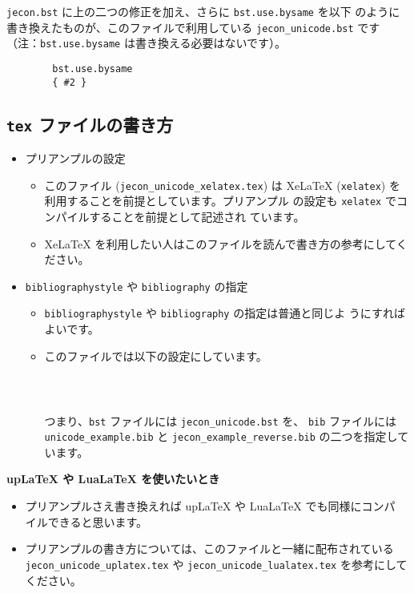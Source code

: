 \documentclass[a4paper,10pt]{bxjsarticle}
\begin{document}
\texttt{jecon.bst} に上の二つの修正を加え、さらに \texttt{bst.use.bysame} を以下
のように書き換えたものが、このファイルで利用している \texttt{jecon\_unicode.bst}
です（注：\texttt{bst.use.bysame} は書き換える必要はないです）。
\begin{verbatim}
        bst.use.bysame
        { #2 }
\end{verbatim}

\subsection{\texttt{tex} ファイルの書き方}

\begin{itemize}
 \item プリアンプルの設定
       \begin{itemize}
        \item このファイル (\texttt{jecon\_unicode\_xelatex.tex}) は XeLaTeX
              (\texttt{xelatex}) を利用することを前提としています。プリアンプル
              の設定も \texttt{xelatex} でコンパイルすることを前提として記述され
	      ています。
        \item XeLaTeX を利用したい人はこのファイルを読んで書き方の参考にしてく
              ださい。
       \end{itemize}
 \item \texttt{bibliographystyle} や \texttt{bibliography} の指定
       \begin{itemize}
	\item \texttt{bibliographystyle} や \texttt{bibliography} の指定は普通と同じよ
       うにすればよいです。
	\item このファイルでは以下の設定にしています。
\begin{verbatim}
           
            
\end{verbatim}
       つまり、\texttt{bst} ファイルには \texttt{jecon\_unicode.bst} を、
	      \texttt{bib} ファイルには \texttt{unicode\_example.bib} と
	      \texttt{jecon\_example\_reverse.bib} の二つを指定しています。
       \end{itemize}
\end{itemize}

\vspace*{1em}

\textbf{upLaTeX や LuaLaTeX を使いたいとき}
\begin{itemize}
	\item プリアンプルさえ書き換えれば upLaTeX や LuaLaTeX でも同様にコンパ
	      イルできると思います。
	\item プリアンプルの書き方については、このファイルと一緒に配布されている
	      \texttt{jecon\_unicode\_uplatex.tex} や
	      \texttt{jecon\_unicode\_lualatex.tex} を参考にしてください。
\end{itemize}
\end{document}

